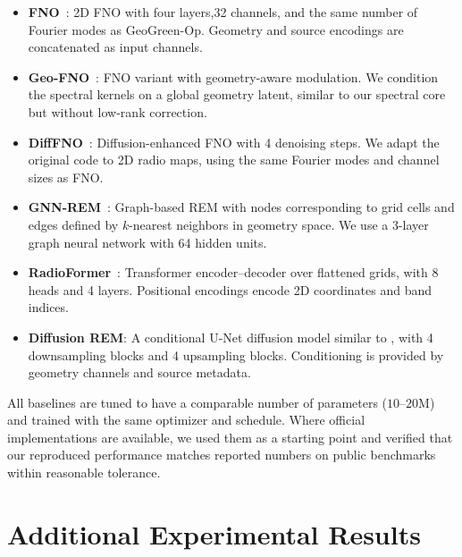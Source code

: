 \documentclass{article}
\begin{document}
\begin{itemize}[leftmargin=1.5em]
\item \textbf{FNO}~\cite{li2020fourier}:
2D FNO with four layers,32 channels, and the same number of
Fourier modes as GeoGreen-Op.
Geometry and source encodings are concatenated as input channels.

\item \textbf{Geo-FNO}~\cite{gao2021geofno}:
FNO variant with geometry-aware modulation.
We condition the spectral kernels on a global geometry latent,
similar to our spectral core but without low-rank correction.

\item \textbf{DiffFNO}~\cite{Liu_2025_CVPR}:
Diffusion-enhanced FNO with 4 denoising steps.
We adapt the original code to 2D radio maps, using the same
Fourier modes and channel sizes as FNO.

\item \textbf{GNN-REM}~\cite{chen2023gnnrem}:
Graph-based REM with nodes corresponding to grid cells and
edges defined by $k$-nearest neighbors in geometry space.
We use a 3-layer graph neural network with 64 hidden units.

\item \textbf{RadioFormer}~\cite{fang2025radioformer}:
Transformer encoder–decoder over flattened grids,
with 8 heads and 4 layers.
Positional encodings encode 2D coordinates and band indices.

\item \textbf{Diffusion REM}:
A conditional U-Net diffusion model similar to
\cite{zhang2024spectrumnet,jia2025rmdm},
with 4 downsampling blocks and 4 upsampling blocks.
Conditioning is provided by geometry channels and source metadata.
\end{itemize}

All baselines are tuned to have a comparable number of parameters
($10$–$20$M) and trained with the same optimizer and schedule.
Where official implementations are available, we used them as a starting point
and verified that our reproduced performance matches reported numbers
on public benchmarks within reasonable tolerance.


\section{Additional Experimental Results}
\label{app:additional_results}
\end{document}

